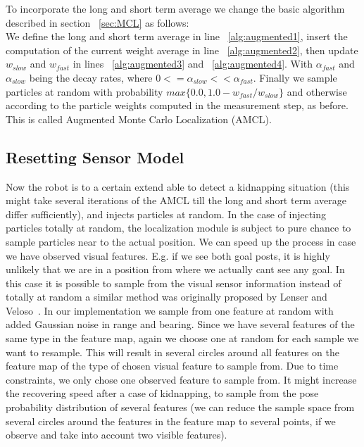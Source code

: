 \documentclass[	DIV=calc,%
							paper=a4,%
							fontsize=9pt,%
							twocolumn]{scrartcl}	 					%
\begin{document}
To incorporate the long and short term average we change the basic algorithm described in section ~\ref{sec:MCL} as follows:\\
We define the long and short term average in line ~\ref{alg:augmented1}, insert the computation of the current weight average in line ~\ref{alg:augmented2}, then update $w_{slow}$ and $w_{fast}$ in lines ~\ref{alg:augmented3} and ~\ref{alg:augmented4}. With $\alpha_{fast}$ and $\alpha_{slow}$ being the decay rates, where $0<=\alpha_{slow}<<\alpha_{fast}$. Finally we sample particles at random with probability $max\{0.0,1.0-w_{fast}/w_{slow}\}$ and otherwise according to the particle weights computed in the measurement step, as before.
This is called Augmented Monte Carlo Localization (AMCL).
\subsection{Resetting Sensor Model}
\label{sec:Reset}
Now the robot is to a certain extend able to detect a kidnapping situation (this might take several iterations of the AMCL till the long and short term average differ sufficiently), and injects particles at random. 
In the case of injecting particles totally at random, the localization module is subject to pure chance to sample particles near to the actual position. We can speed up the process in case we have observed visual features. E.g. if we see both goal posts, it is highly unlikely that we are in a position from where we actually cant see any goal.
In this case it is possible to sample from the visual sensor information instead of totally at random a similar method  was originally proposed by Lenser and Veloso~\cite{SensorResetting}. In our implementation we sample from one feature at random with added Gaussian noise in range and bearing. Since we have several features of the same type in the feature map, again we choose one at random for each sample we want to resample. This will result in several circles around all features on the feature map of the type of chosen visual feature to sample from. Due to time constraints, we only chose one observed feature to sample from.
It might increase the recovering speed after a case of kidnapping, to sample from the pose probability distribution of several features (we can reduce the sample space from several circles around the features in the feature map to several points, if we observe and take into account two visible features).
\end{document}
